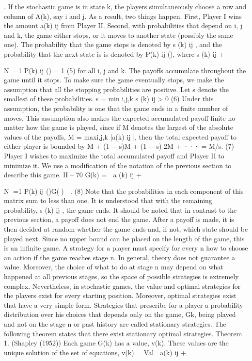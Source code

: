 . If the
stochastic game is in state k, the players simultaneously choose a row and column of A(k),
say i and j. As a result, two things happen. First, Player I wins the amount a(k)
ij from
Player II. Second, with probabilities that depend on i, j and k, the game either stops, or
it moves to another state (possibly the same one). The probability that the game stops is
denoted by s
(k)
ij , and the probability that the next state is  is denoted by P(k)
ij (), where
s
(k)
ij +

N
=1
P(k)
ij () = 1 (5)
for all i, j and k.
The payoffs accumulate throughout the game until it stops. To make sure the game
eventually stops, we make the assumption that all the stopping probabilities are positive.
Let s denote the smallest of these probabilities.
s = min
i,j,k
s
(k)
ij > 0 (6)
Under this assumption, the probability is one that the game ends in a finite number of
moves. This assumption also makes the expected accumulated payoff finite no matter how
the game is played, since if M denotes the largest of the absolute values of the payoffs,
M = maxi,j,k |a(k)
ij |, then the total expected payoff to either player is bounded by
M + (1 − s)M + (1 − s)
2M + ··· = M/s. (7)
Player I wishes to maximize the total accumulated payoff and Player II to minimize
it. We use a modification of the notation of the previous section to describe this game.
II – 70
G(k) =

a
(k)
ij +

N
=1
P(k)
ij ()G()

. (8)
Note that the probabilities in each component of this matrix sum to less than one. It is
understood that with the remaining probability, s
(k)
ij , the game ends. It should be noted
that in contrast to the previous section, a payoff does not end the game. After a payoff is
made, it is then decided at random whether the game ends and, if not, which state should
be played next.
Since no upper bound can be placed on the length of the game, this is an infinite
game. A strategy for a player must specify for every n how to choose an action if the game
reaches stage n. In general, theory does not guarantee a value. Moreover, the choice of
what to do at stage n may depend on what happened at all previous stages, so the space
of possible strategies is extremely complex.
Nevertheless, in stochastic games, the value and optimal strategies for the players
exist for every starting position. Moreover, optimal strategies exist that have a very simple
form. Strategies that prescribe for a player a probability distribution over his choices that
depends only on the game, Gk, being played and not on the stage n or past history are
called stationary strategies. The following theorem states that there exist stationary
optimal strategies.
Theorem 1. (Shapley (1952)) Each game G(k) has a value, v(k). These values are the
unique solution of the set of equations,
v(k) = Val 
a(k)
ij +

